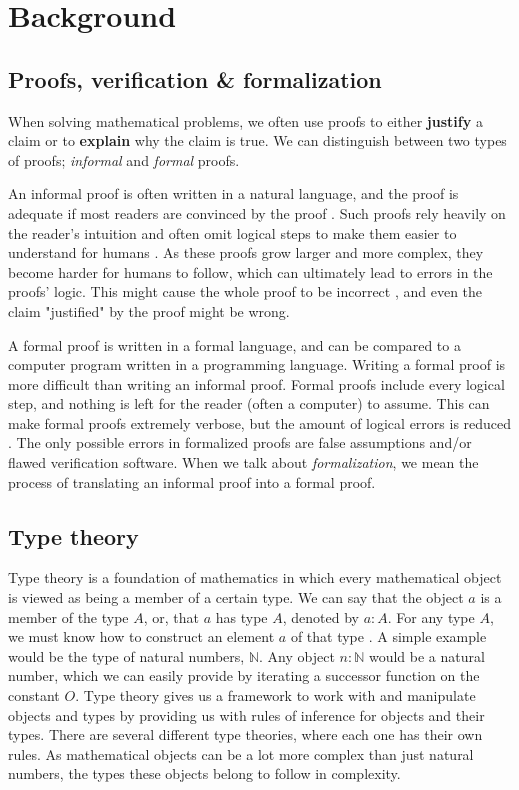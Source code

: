 \chapter{Background}
\label{ch:background}

\section{Proofs, verification \& formalization}
\label{sec:proofs_formalization}

When solving mathematical problems, we often use proofs
to either \textbf{justify} a claim or to \textbf{explain} why the claim is true.
We can distinguish between two types of proofs; \emph{informal} and \emph{formal} proofs.

An informal proof is often written in a natural language, and the proof is adequate if most
readers are convinced by the proof \cite[ch.~2]{bpierce}. Such proofs rely heavily on the reader's intuition
and often omit logical steps to make them easier to understand for humans \cite[p.~1371]{ams:formal-proof}.
As these proofs grow larger and more complex, they become harder for humans to follow,
which can ultimately lead to errors in the proofs' logic. This might cause the whole proof
to be incorrect \cite{rkhamsi}, and even the claim "justified" by the proof might be wrong.

A formal proof is written in a formal language, and can be compared to a computer program
written in a programming language. Writing a formal proof is more difficult than writing an informal proof.
Formal proofs include every logical step, and nothing is left for the reader (often a computer) to assume.
This can make formal proofs extremely verbose, but the amount of logical errors is reduced \cite[p.~1371]{ams:formal-proof}.
The only possible errors in formalized proofs are false assumptions and/or flawed verification software.
When we talk about \emph{formalization}, we mean the process of translating an informal proof into a formal proof.

\section{Type theory}
\label{sec:type_theory}

Type theory is a foundation of mathematics \cite{typetheorystan}
in which every mathematical object is viewed as being a member of a certain type.
We can say that the object $a$ is a member of the type $A$,
or, that $a$ has type $A$, denoted by $a : A$.
For any type $A$, we must know how to construct an element $a$ of that type \cite[p.~76]{lof1}.
A simple example would be the type of natural numbers, $\mathbb{N}$.
Any object $n : \mathbb{N}$ would be a natural number,
which we can easily provide by iterating a successor function on the constant $O$.
Type theory gives us a framework to work with and manipulate objects and types
by providing us with rules of inference for objects and their types.
There are several different type theories, where each one has their own rules.
As mathematical objects can be a lot more complex than just natural numbers,
the types these objects belong to follow in complexity.

